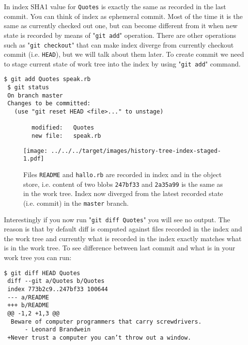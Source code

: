 \documentclass{article}
\theoremstyle{definition}
\begin{document}
        \noindent In index SHA1 value for \texttt{Quotes} is exactly the same as recorded in the last commit. You can
        think of index as ephemeral commit. Most of the time it is the same as currently checked out one, but can
        become different from it when new state is recorded by means of "\texttt{git add}" operation. There are other
        operations such as "\texttt{git checkout}" that can make index diverge from currently checkout commit
        (i.e. \texttt{HEAD}), but we will talk about them later. To create commit we need to stage current state of work
        tree into the index by using "\texttt{git add}" command.

    \begin{Verbatim}[frame=single]
 $ git add Quotes speak.rb
 $ git status
 On branch master
 Changes to be committed:
   (use "git reset HEAD <file>..." to unstage)

        modified:   Quotes
        new file:   speak.rb
        \end{Verbatim}

        \begin{figure}[h]
        \centering\texttt{[image: ../../../target/images/history-tree-index-staged-1.pdf]}
        \caption{Files \texttt{README} and \texttt{hallo.rb} are recorded in index and in the object store, i.e.
          content of two blobs \texttt{247bf33} and \texttt{2a35a99} is the same as in the work tree. Index now
          diverged from the latest recorded state (i.e. commit) in the \texttt{master} branch.
          \label{fig:history-tree-index-staged-1}}
        \end{figure}

        \noindent Interestingly if you now run "\texttt{git diff Quotes}" you will see no output. The reason is that by
        default diff is computed against files recorded in the index and the work tree and currently what is
        recorded in the index exactly matches what is in the work tree. To see difference between last commit and what
        is in your work tree you can run:

    \begin{Verbatim}[frame=single]
 $ git diff HEAD Quotes
 diff --git a/Quotes b/Quotes
 index 773b2c9..247bf33 100644
 --- a/README
 +++ b/README
 @@ -1,2 +1,3 @@
  Beware of computer programmers that carry screwdrivers.
      - Leonard Brandwein
 +Never trust a computer you can’t throw out a window.
        \end{Verbatim}
\end{document}
